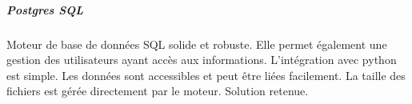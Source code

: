 			\subparagraph{Postgres SQL}
				Moteur de base de données SQL solide et robuste.
				Elle permet également une gestion des utilisateurs ayant accès aux informations.
				L'intégration avec python est simple.
				Les données sont accessibles et peut être liées facilement.
				La taille des fichiers est gérée directement par le moteur.
				Solution retenue.